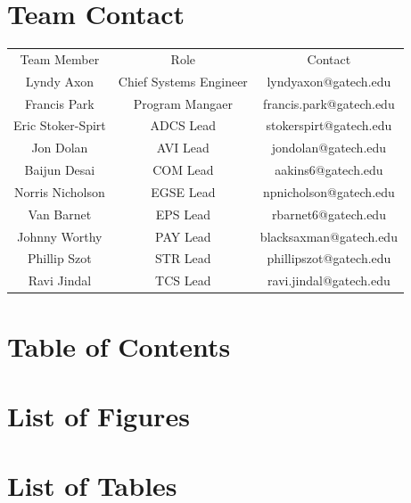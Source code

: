 \documentclass{article}
\begin{document}
\vspace{2cm}

\section*{\centering Team Contact}

\vspace{0.5in}
\begin{center}
\begin{tabular}{|c|c|c|}
    \hline
    Team Member       &  Role            &  Contact                 \\ \hhline{|=|=|=|}
    Lyndy Axon  &  Chief Systems Engineer     &  lyndyaxon@gatech.edu    \\ \hline
    Francis Park    & Program Mangaer  &  francis.park@gatech.edu  \\ \hline
    Eric Stoker-Spirt & ADCS Lead & stokerspirt@gatech.edu \\ \hline
    Jon Dolan	 & AVI Lead & jondolan@gatech.edu \\ \hline
    Baijun Desai & COM Lead & aakins6@gatech.edu \\ \hline
	Norris Nicholson & EGSE Lead & npnicholson@gatech.edu \\ \hline
	Van Barnet & EPS Lead & rbarnet6@gatech.edu \\ \hline
	Johnny Worthy & PAY Lead & blacksaxman@gatech.edu \\ \hline
	Phillip Szot & STR Lead & phillipszot@gatech.edu \\ \hline
	Ravi Jindal & TCS Lead & ravi.jindal@gatech.edu \\ \hline
    
\end{tabular}
\end{center}

\newpage

\section*{\centering Table of Contents}
\tableofcontents

\newpage

\section*{\centering List of Figures}
\listoffigures

\section*{\centering List of Tables}
\listoftables
\end{document}
